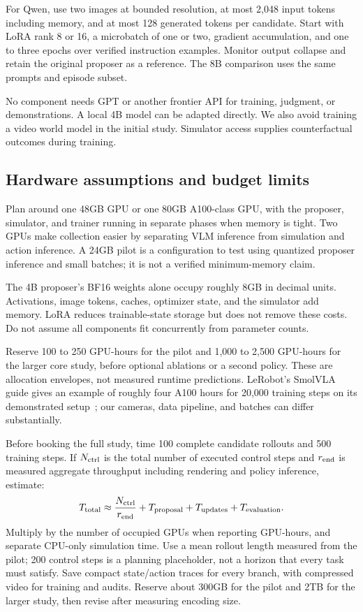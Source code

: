 \documentclass[11pt]{article}
\begin{document}
For Qwen, use two images at bounded resolution, at most 2,048 input tokens including memory, and at most 128 generated tokens per candidate. Start with LoRA rank 8 or 16, a microbatch of one or two, gradient accumulation, and one to three epochs over verified instruction examples. Monitor output collapse and retain the original proposer as a reference. The 8B comparison uses the same prompts and episode subset.

No component needs GPT or another frontier API for training, judgment, or demonstrations. A local 4B model can be adapted directly. We also avoid training a video world model in the initial study. Simulator access supplies counterfactual outcomes during training.

\subsection{Hardware assumptions and budget limits}

Plan around one 48GB GPU or one 80GB A100-class GPU, with the proposer, simulator, and trainer running in separate phases when memory is tight. Two GPUs make collection easier by separating VLM inference from simulation and action inference. A 24GB pilot is a configuration to test using quantized proposer inference and small batches; it is not a verified minimum-memory claim.

The 4B proposer's BF16 weights alone occupy roughly 8GB in decimal units. Activations, image tokens, caches, optimizer state, and the simulator add memory. LoRA reduces trainable-state storage but does not remove these costs. Do not assume all components fit concurrently from parameter counts.

Reserve 100 to 250 GPU-hours for the pilot and 1,000 to 2,500 GPU-hours for the larger core study, before optional ablations or a second policy. These are allocation envelopes, not measured runtime predictions. LeRobot's SmolVLA guide gives an example of roughly four A100 hours for 20,000 training steps on its demonstrated setup~\cite{smoldocs}; our cameras, data pipeline, and batches can differ substantially.

Before booking the full study, time 100 complete candidate rollouts and 500 training steps. If $N_{\rm ctrl}$ is the total number of executed control steps and $r_{\rm end}$ is measured aggregate throughput including rendering and policy inference, estimate:
\begin{equation}
T_{\rm total}\approx \frac{N_{\rm ctrl}}{r_{\rm end}}
  +T_{\rm proposal}+T_{\rm updates}+T_{\rm evaluation}.
\end{equation}
Multiply by the number of occupied GPUs when reporting GPU-hours, and separate CPU-only simulation time. Use a mean rollout length measured from the pilot; 200 control steps is a planning placeholder, not a horizon that every task must satisfy. Save compact state/action traces for every branch, with compressed video for training and audits. Reserve about 300GB for the pilot and 2TB for the larger study, then revise after measuring encoding size.
\end{document}
